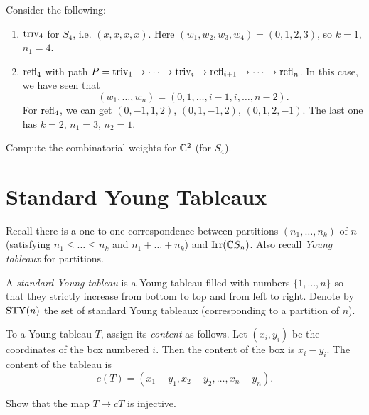 \begin{example}
  Consider the following:
  \begin{enumerate}
    \item $\operatorname{triv}_4$ for $S_4$, i.e.
      $(x, x, x, x)$.
      Here $(w_1, w_2, w_3, w_4) = (0, 1, 2, 3)$, so
      $k = 1$, $n_1 = 4$.
    \item $\operatorname{refl}_4$ with path
      $P = \operatorname{triv}_1 \to \dots \to \operatorname{triv}_i \to \operatorname{refl}_{i + 1} \to \dots \to \operatorname{refl}_n$. In
      this case, we have seen that
      \[
        (w_1, \dots, w_n)
        = (0, 1, \dots, i - 1, i, \dots, n - 2).
      \]
      For $\operatorname{refl}_4$, we can get
      $(0, -1, 1, 2)$, $(0, 1, -1, 2)$,
      $(0, 1, 2, -1)$. The last one has
      $k = 2$, $n_1 = 3$, $n_2 = 1$.
  \end{enumerate}
\end{example}

\begin{exercise}
  Compute the combinatorial weights
  for $\mathbb{C}^2$ (for $S_4$).
\end{exercise}

\section{Standard Young Tableaux}

\begin{remark}
  Recall there is a one-to-one
  correspondence between partitions
  $(n_1, \dots, n_k)$ of $n$ (satisfying
  $n_1 \le \dots \le n_k$ and
  $n_1 + \dots + n_k$) and
  $\operatorname{Irr}(\mathbb{C} S_n)$. Also
  recall \emph{Young tableaux}
  for partitions.
\end{remark}

\begin{definition}
  A \emph{standard Young tableau}
  is a Young tableau
  filled with numbers $\{1, \dots, n\}$
  so that they strictly increase
  from bottom to top and from left to right.
  Denote by $\operatorname{STY}(n)$ the set of
  standard Young tableaux (corresponding
  to a partition of $n$).
\end{definition}

\begin{definition}
  To a Young tableau $T$, assign its
  \emph{content} as follows. Let
  $(x_i, y_i)$ be the coordinates
  of the box numbered $i$. Then the
  content of the box is $x_i - y_i$.
  The content of the tableau is
  \[
    c(T) = (x_1 - y_1, x_2 - y_2, \dots, x_n - y_n).
  \]
\end{definition}

\begin{exercise}
  Show that the map $T \mapsto cT$
  is injective.
\end{exercise}
